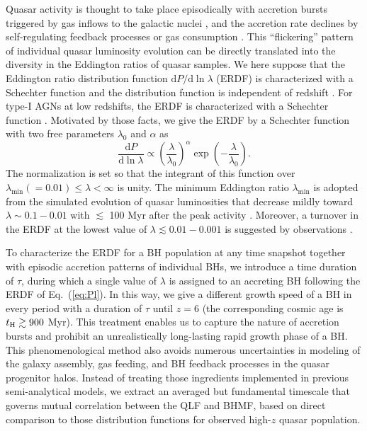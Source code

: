 \documentclass[twocolumn, twocolappendix]{aastex63}
\newcommand{\tlife}{\tau}
\newcommand{\D}{\mathrm{d}}
\begin{document}
\begin{CJK*}{UTF8}{gbsn}
Quasar activity is thought to take place episodically with accretion bursts triggered by gas inflows to the galactic nuclei
\citep{2005Natur.433..604D,2005ApJ...630..705H}, 
and the accretion rate declines by self-regulating feedback processes \citep[e.g.,][]{2008ApJ...686..815Y,2011ApJ...737...26N} 
or gas consumption \citep{1991MNRAS.248..754P,2005ApJ...634..901Y,2007MNRAS.377L..25K}. 
This ``flickering'' pattern of individual quasar luminosity evolution can be directly translated into the diversity 
in the Eddington ratios of quasar samples. 
We here suppose that the Eddington ratio distribution function $\D P/ \D\ln\lambda$ (ERDF) is characterized
with a Schechter function and the distribution function is independent of redshift 
\citep{2006ApJ...639..700H,2009ApJ...698.1550H}.
For type-I AGNs at low redshifts, the ERDF is characterized with a Schechter function
\citep{2015MNRAS.447.2085S,2016ApJ...826...12J,2018MNRAS.474.1225A}.
Motivated by those facts, we give the ERDF by a Schechter function with two free parameters $\lambda_0$ and $\alpha$ as
%
\begin{equation}
  \label{eq:Pl}
  \frac{\D P}{ \D \ln \lambda} \propto
  \left(\frac{\lambda} {\lambda_0} \right)^\alpha \exp{\left(-\frac{\lambda}{\lambda_0}\right)}.
\end{equation}
%
The normalization is set so that the integrant of this function over $\lambda_\mathrm{min}(=0.01) \leq \lambda < \infty$ is unity.
The minimum Eddington ratio $\lambda_\mathrm{min}$ is adopted from the simulated evolution of quasar luminosities 
that decrease mildly toward $\lambda \sim 0.1-0.01$ with $\lesssim$ 100 Myr after the peak activity \citep{2011ApJ...737...26N}.
Moreover, a turnover in the ERDF at the lowest value of $\lambda\lesssim 0.01-0.001$ is suggested by observations \citep{2018MNRAS.474.1225A}.  


To characterize the ERDF for a BH population at any time snapshot together with episodic 
accretion patterns of individual BHs, 
we introduce a time duration of $\tlife$, during which a single value of $\lambda$ is assigned to an accreting BH
following the ERDF of Eq.~(\ref{eq:Pl}).
In this way, we give a different growth speed of a BH in every period with a duration of $\tlife$ until $z=6$ 
(the corresponding cosmic age is $t_{\rm H}\gtrsim 900$ Myr).
This treatment enables us to capture the nature of accretion bursts and prohibit an unrealistically 
long-lasting rapid growth phase of a BH.
This phenomenological method also avoids numerous uncertainties in modeling of the galaxy assembly, 
gas feeding, and BH feedback processes in the quasar progenitor halos.
Instead of treating those ingredients implemented in previous semi-analytical models, we extract 
an averaged but fundamental timescale that governs mutual correlation between the QLF and BHMF,
based on direct comparison to those distribution functions for observed high-$z$ quasar population.



\end{CJK*}
\end{document}
